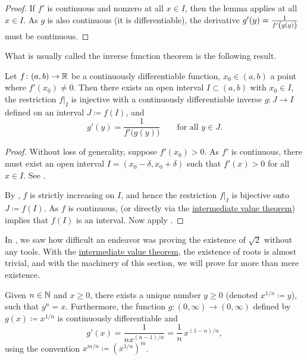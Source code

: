 \begin{proof}
If $f'$ is continuous and nonzero at all $x \in I$,
then the lemma applies at all $x \in I$.  As $g$ is also
continuous (it is differentiable), the derivative $g'(y) =
\frac{1}{f'\left(\vphantom{1^1_1}g(y)\right)}$ must be continuous.
\end{proof}

What is usually called the inverse function theorem is the following result.

\begin{thm}
Let $f \colon (a,b) \to {\mathbb{R}}$ be a continuously differentiable function,
$x_0 \in (a,b)$ a point where $f'(x_0) \neq 0$.  Then there exists
an open interval $I \subset (a,b)$ with $x_0 \in I$, the
restriction $f|_{I}$ is injective with a continuously differentiable inverse
$g \colon J \to I$ defined on an interval $J \coloneqq f(I)$,
and
\begin{equation*}
g'(y) = \frac{1}{f'\bigl( g(y) \bigr)} \qquad \text{for all } y \in J.
\end{equation*}
\end{thm}

\begin{proof}
Without loss of generality, suppose $f'(x_0) > 0$.  As $f'$ is
continuous, there must exist an open interval $I = (x_0-\delta,x_0+\delta)$ 
such that $f'(x) > 0$ for all $x \in I$.  See
.

By , $f$ is strictly increasing
on $I$, and hence the restriction $f|_{I}$ is bijective onto $J \coloneqq f(I)$.
As $f$ is continuous,
(or directly via the
\hyperref[IVT:thm]{intermediate value theorem})
implies that
$f(I)$ is an interval.
Now apply .
\end{proof}

In , we saw how difficult an
endeavor was proving the existence of $\sqrt{2}$ without any
tools.
With the \hyperref[IVT:thm]{intermediate value theorem},
the existence of roots is almost trivial, and
with the machinery of this section, we will prove
far more than mere existence.

\begin{cor}
Given $n \in {\mathbb{N}}$ and $x \geq 0$, there exists a unique 
number $y \geq 0$ (denoted $x^{1/n} \coloneqq y$), such that $y^n = x$.  Furthermore,
the function $g \colon (0,\infty) \to (0,\infty)$ defined by
$g(x) \coloneqq x^{1/n}$ is continuously differentiable and
\begin{equation*}
g'(x) = \frac{1}{nx^{(n-1)/n}} = \frac{1}{n} \, x^{(1-n)/n} ,
\end{equation*}
using the convention $x^{m/n} \coloneqq {(x^{1/n})}^{m}$.
\end{cor}

